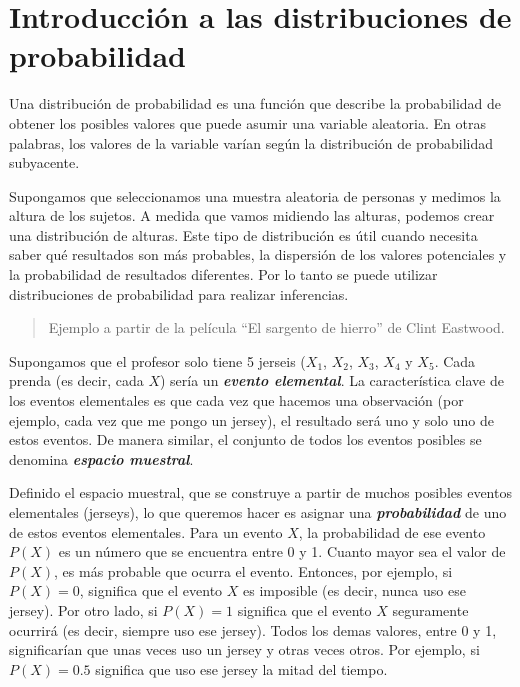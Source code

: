 \documentclass[
]{book}
\begin{document}
\hypertarget{introducciuxf3n-a-las-distribuciones-de-probabilidad}{%
\section{Introducción a las distribuciones de probabilidad}\label{introducciuxf3n-a-las-distribuciones-de-probabilidad}}

Una distribución de probabilidad es una función que describe la probabilidad de obtener los posibles valores que puede asumir una variable aleatoria. En otras palabras, los valores de la variable varían según la distribución de probabilidad subyacente.

Supongamos que seleccionamos una muestra aleatoria de personas y medimos la altura de los sujetos. A medida que vamos midiendo las alturas, podemos crear una distribución de alturas. Este tipo de distribución es útil cuando necesita saber qué resultados son más probables, la dispersión de los valores potenciales y la probabilidad de resultados diferentes. Por lo tanto se puede utilizar distribuciones de probabilidad para realizar inferencias.

\begin{quote}
Ejemplo a partir de la película ``El sargento de hierro'' de Clint Eastwood.
\end{quote}

Supongamos que el profesor solo tiene 5 jerseis (\(X_1\), \(X_2\), \(X_3\), \(X_4\) y \(X_5\). Cada prenda (es decir, cada \(X\)) sería un \textbf{\emph{evento elemental}}. La característica clave de los eventos elementales es que cada vez que hacemos una observación (por ejemplo, cada vez que me pongo un jersey), el resultado será uno y solo uno de estos eventos. De manera similar, el conjunto de todos los eventos posibles se denomina \textbf{\emph{espacio muestral}}.

Definido el espacio muestral, que se construye a partir de muchos posibles eventos elementales (jerseys), lo que queremos hacer es asignar una \textbf{\emph{probabilidad}} de uno de estos eventos elementales. Para un evento \(X\), la probabilidad de ese evento \(P(X)\) es un número que se encuentra entre 0 y 1. Cuanto mayor sea el valor de \(P(X)\), es más probable que ocurra el evento. Entonces, por ejemplo, si \(P(X)=0\), significa que el evento \(X\) es imposible (es decir, nunca uso ese jersey). Por otro lado, si \(P(X)=1\) significa que el evento \(X\) seguramente ocurrirá (es decir, siempre uso ese jersey). Todos los demas valores, entre 0 y 1, significarían que unas veces uso un jersey y otras veces otros. Por ejemplo, si \(P(X)=0.5\) significa que uso ese jersey la mitad del tiempo.
\end{document}

